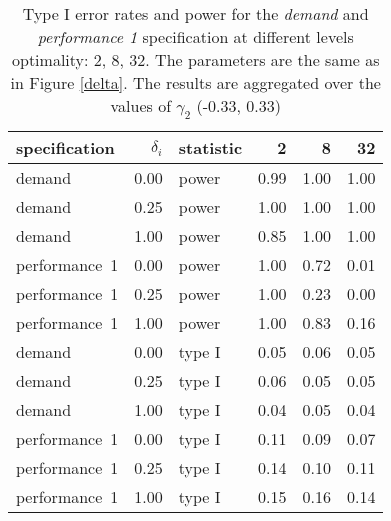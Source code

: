 \begin{table}[ht]
\centering
\begingroup\footnotesize
\begin{tabular}{lrlrrr}
  \hline
specification & $\delta_i$ & statistic & 2 & 8 & 32 \\ 
  \hline
demand & 0.00 & power & 0.99 & 1.00 & 1.00 \\ 
  demand & 0.25 & power & 1.00 & 1.00 & 1.00 \\ 
  demand & 1.00 & power & 0.85 & 1.00 & 1.00 \\ 
  performance~1 & 0.00 & power & 1.00 & 0.72 & 0.01 \\ 
  performance~1 & 0.25 & power & 1.00 & 0.23 & 0.00 \\ 
  performance~1 & 1.00 & power & 1.00 & 0.83 & 0.16 \\ 
  demand & 0.00 & type I & 0.05 & 0.06 & 0.05 \\ 
  demand & 0.25 & type I & 0.06 & 0.05 & 0.05 \\ 
  demand & 1.00 & type I & 0.04 & 0.05 & 0.04 \\ 
  performance~1 & 0.00 & type I & 0.11 & 0.09 & 0.07 \\ 
  performance~1 & 0.25 & type I & 0.14 & 0.10 & 0.11 \\ 
  performance~1 & 1.00 & type I & 0.15 & 0.16 & 0.14 \\ 
   \hline
\end{tabular}
\endgroup
\caption{Type I error rates and power for the \emph{demand}
             and \emph{performance 1} specification at different levels 
             optimality: 2, 8, 32. The parameters are the same as in 
             Figure \ref{delta}. The results are aggregated over the values              of $\gamma_2$ (-0.33, 0.33)} 
\label{delta-table}
\end{table}
